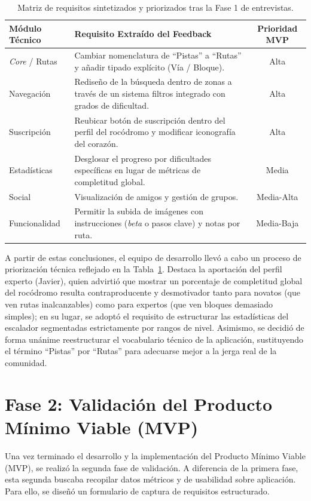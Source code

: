 \begin{table}[htbp]
\centering
\small
\begin{tabular}{lp{6cm}c}
\hline
\textbf{Módulo Técnico} & \textbf{Requisito Extraído del Feedback} & \textbf{Prioridad MVP} \\ \hline
\textit{Core} / Rutas & Cambiar nomenclatura de ``Pistas'' a ``Rutas'' y añadir tipado explícito (Vía / Bloque). & Alta \\
Navegación & Rediseño de la búsqueda dentro de zonas a través de un sistema filtros integrado con grados de dificultad. & Alta \\
Suscripción & Reubicar botón de suscripción dentro del perfil del rocódromo y modificar iconografía del corazón. & Alta \\
Estadísticas & Desglosar el progreso por dificultades específicas en lugar de métricas de completitud global. & Media \\
Social & Visualización de amigos  y gestión de grupos. & Media-Alta \\
Funcionalidad & Permitir la subida de imágenes con instrucciones (\textit{beta} o pasos clave) y notas por ruta. & Media-Baja \\ \hline
\end{tabular}
\caption{Matriz de requisitos sintetizados y priorizados tras la Fase 1 de entrevistas.}
\label{tab:requisitosFase1}
\end{table}

A partir de estas conclusiones, el equipo de desarrollo llevó a cabo un proceso de priorización técnica reflejado en la Tabla~\ref{tab:requisitosFase1}. Destaca la aportación del perfil experto (Javier), quien advirtió que mostrar un porcentaje de completitud global del rocódromo resulta contraproducente y desmotivador tanto para novatos (que ven rutas inalcanzables) como para expertos (que ven bloques demasiado simples); en su lugar, se adoptó el requisito de estructurar las estadísticas del escalador segmentadas estrictamente por rangos de nivel. Asimismo, se decidió de forma unánime reestructurar el vocabulario técnico de la aplicación, sustituyendo el término ``Pistas'' por ``Rutas'' para adecuarse mejor a la jerga real de la comunidad.

\section{Fase 2: Validación del Producto Mínimo Viable (MVP)}

Una vez terminado el desarrollo y la implementación del Producto Mínimo Viable (MVP), se realizó la segunda fase de validación. A diferencia de la primera fase, esta segunda buscaba recopilar datos métricos y de usabilidad sobre aplicación. Para ello, se diseñó un formulario de captura de requisitos estructurado.


